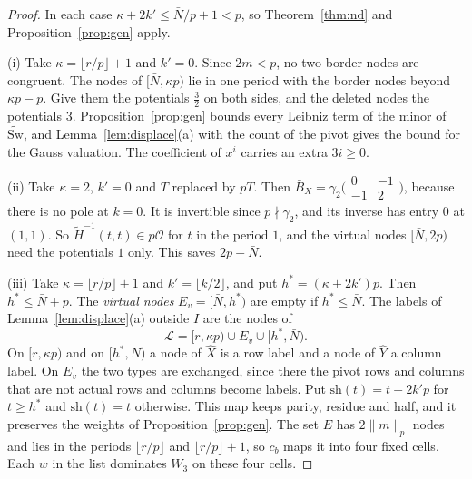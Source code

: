\documentclass[11pt]{amsart}
\theoremstyle{definition}
\theoremstyle{remark}
\numberwithin{equation}{section}
\newcommand{\cO}{\mathcal O}
\begin{document}
\begin{proof}
In each case $\kappa+2k'\le\bar N/p+1<p$, so Theorem~\ref{thm:nd} and Proposition~\ref{prop:gen} apply.

(i) Take $\kappa=\lfloor r/p\rfloor+1$ and $k'=0$. Since $2m<p$, no two border nodes are congruent. The nodes of
$[\bar N,\kappa p)$ lie in one period with the border nodes beyond $\kappa p-p$. Give them the potentials $\frac32$ on both
sides, and the deleted nodes the potentials $3$. Proposition~\ref{prop:gen} bounds every Leibniz term of the minor of
$\widetilde{\mathrm{Sw}}$, and Lemma~\ref{lem:displace}(a) with the count of the pivot gives the bound for the Gauss
valuation. The coefficient of $x^i$ carries an extra $3i\ge0$.

(ii) Take $\kappa=2$, $k'=0$ and $T$ replaced by $pT$. Then
$\bar B_X=\gamma_2\bigl(\begin{smallmatrix}0&-1\\-1&2\end{smallmatrix}\bigr)$, because there is no pole at
$k=0$. It is invertible since $p\nmid\gamma_2$, and its inverse has entry $0$ at $(1,1)$. So
$\widetilde H^{-1}(t,t)\in p\cO$ for $t$ in the period $1$, and the virtual nodes $[\bar N,2p)$ need the
potentials $1$ only. This saves $2p-\bar N$.

(iii) Take $\kappa=\lfloor r/p\rfloor+1$ and $k'=\lfloor k/2\rfloor$, and put $h^*=(\kappa+2k')p$. Then
$h^*\le\bar N+p$. The \emph{virtual nodes} $E_v=[\bar N,h^*)$ are empty if $h^*\le\bar N$. The labels of
Lemma~\ref{lem:displace}(a) outside $I$ are the nodes of
\[
 \mathcal L=[r,\kappa p)\cup E_v\cup[h^*,\bar N).
\]
On $[r,\kappa p)$ and on $[h^*,\bar N)$ a node of $\hat X$ is a row label and a node of $\hat Y$ a column label. On
$E_v$ the two types are exchanged, since there the pivot rows and columns that are not actual rows and
columns become labels. Put $\mathrm{sh}(t)=t-2k'p$ for $t\ge h^*$ and $\mathrm{sh}(t)=t$ otherwise. This map keeps
parity, residue and half, and it preserves the weights of Proposition~\ref{prop:gen}. The set $E$ has
$2\|m\|_p$ nodes and lies in the periods $\lfloor r/p\rfloor$ and $\lfloor r/p\rfloor+1$, so $c_b$ maps it into four fixed
cells. Each $w$ in the list dominates $W_3$ on these four cells.


\end{proof}
\end{document}
